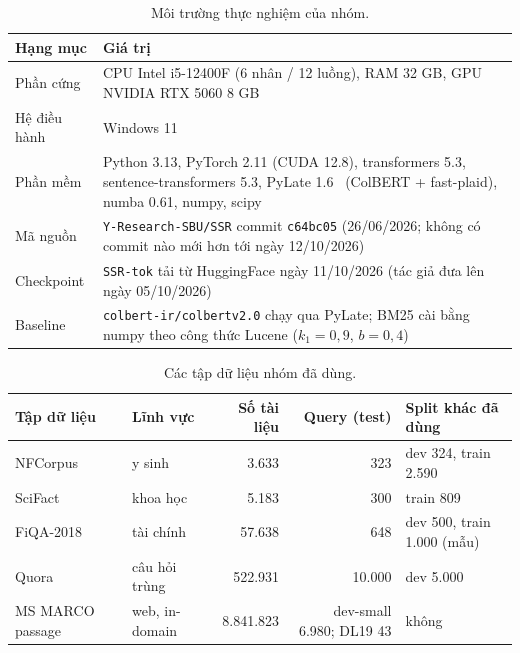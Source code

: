 \documentclass[a4paper,13pt]{extreport}
\theoremstyle{plain}
\begin{document}
\begin{table}[htbp]
\centering
\caption{Môi trường thực nghiệm của nhóm.}
\label{tab:env}
\small
\begin{tabular}{lp{9.5cm}}
\toprule
\textbf{Hạng mục} & \textbf{Giá trị}\\
\midrule
Phần cứng & CPU Intel i5-12400F (6 nhân / 12 luồng), RAM 32 GB, GPU NVIDIA RTX 5060 8 GB\\
Hệ điều hành & Windows 11\\
Phần mềm & Python 3.13, PyTorch 2.11 (CUDA 12.8), transformers 5.3, sentence-transformers 5.3, PyLate 1.6~\cite{chaffin2024} (ColBERT + fast-plaid), numba 0.61, numpy, scipy\\
Mã nguồn & \texttt{Y-Research-SBU/SSR} commit \texttt{c64bc05} (26/06/2026; không có commit nào mới hơn tới ngày 12/10/2026)\\
Checkpoint & \texttt{SSR-tok} tải từ HuggingFace ngày 11/10/2026 (tác giả đưa lên ngày 05/10/2026)\\
Baseline & \texttt{colbert-ir/colbertv2.0} chạy qua PyLate; BM25 cài bằng numpy theo công thức Lucene ($k_1=0{,}9$, $b=0{,}4$)\\
\bottomrule
\end{tabular}
\end{table}

\begin{table}[htbp]
\centering
\caption{Các tập dữ liệu nhóm đã dùng.}
\label{tab:data}
\small
\begin{tabular}{llrrl}
\toprule
\textbf{Tập dữ liệu} & \textbf{Lĩnh vực} & \textbf{Số tài liệu} & \textbf{Query (test)} & \textbf{Split khác đã dùng}\\
\midrule
NFCorpus~\cite{boteva2016} & y sinh & 3.633 & 323 & dev 324, train 2.590\\
SciFact~\cite{wadden2020} & khoa học & 5.183 & 300 & train 809\\
FiQA-2018~\cite{maia2018} & tài chính & 57.638 & 648 & dev 500, train 1.000 (mẫu)\\
Quora & câu hỏi trùng & 522.931 & 10.000 & dev 5.000\\
MS MARCO passage~\cite{nguyen2016} & web, in-domain & 8.841.823 & dev-small 6.980; DL19 43 & không\\
\bottomrule
\end{tabular}
\end{table}
\end{document}
